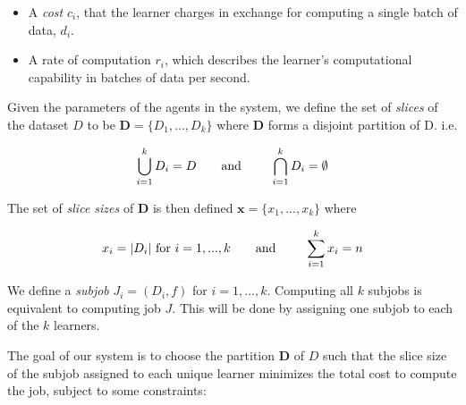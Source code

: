 \documentclass[../mthe-493-final-project.tex]{subfiles}
\begin{document}
    \begin{itemize}
        \item A \textit{cost} $c_i$, that the learner charges in exchange for computing a single batch of data, $d_i$.
        \item A rate of computation $r_i$, which describes the learner's computational capability in batches of data per second.
    \end{itemize}
    
    Given the parameters of the agents in the system, we define the set of \textit{slices} of the dataset $D$ to be $\boldsymbol{D} = \{D_1,...,D_k\}$ where $\boldsymbol{D}$ forms a disjoint partition of D. i.e.
    
    \[\bigcup\limits_{i=1}^k D_i = D \textrm{\qquad and \qquad} \bigcap\limits_{i=1}^k D_i = \emptyset\]

    The set of \textit{slice sizes} of $\boldsymbol{D}$ is then defined $\mathbf{x} = \{x_1,...,x_k\}$ where
    
    \[x_i = \vert D_i \vert \textrm{ for } i = 1,...,k \textrm{\qquad and \qquad} \sum_{i=1}^k x_i = n\]
    
    We define a \textit{subjob} $J_i = (D_i,f)$ for $i = 1,...,k$. Computing all $k$ subjobs is equivalent to computing job $J$. This will be done by assigning one subjob to each of the $k$ learners.
    
    The goal of our system is to choose the partition $\boldsymbol{D}$ of $D$ such that the slice size of the subjob assigned to each unique learner minimizes the total cost to compute the job, subject to some constraints:
\end{document}
